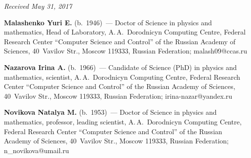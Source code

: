 \vspace*{-6pt}

\hfill{\small\textit{Received May 31, 2017}}

\vspace*{-18pt}

\Contr

\noindent
\textbf{Malashenko Yuri E.} (b.\ 1946)~--- 
Doctor of Science in physics and mathematics, Head of Laboratory, 
A.\,A.~Dorodnicyn Computing Centre, Federal Research Center 
``Computer Science and Control'' of the Russian Academy of Sciences, 
40~Vavilov Str., Moscow 119333, Russian Federation; \mbox{malash09@ccas.ru} 

\vspace*{3pt}

\noindent
\textbf{Nazarova Irina A.} (b.\ 1966)~--- 
Candidate of Science (PhD) in physics and mathematics, scientist,
 A.\,A.~Dorodnicyn Computing Centre, Federal Research Center 
``Computer Science and Control'' of the Russian Academy of Sciences, 
40~Vavilov Str., Moscow 119333, Russian Federation;
\mbox{irina-nazar@yandex.ru}

\vspace*{3pt}

\noindent
\textbf{Novikova Natalya M.} (b.\ 1953)~--- 
Doctor of Science in physics and mathematics,  professor, leading scientist, 
A.\,A.~Dorodnicyn Computing Centre, Federal Research Center 
``Computer Science and Control'' of the Russian Academy of Sciences, 
40~Vavilov Str., Moscow 119333, Russian Federation;
\mbox{n\_novikova@umail.ru}


\label{end\stat}


\renewcommand{\bibname}{\protect\rm Литература} 